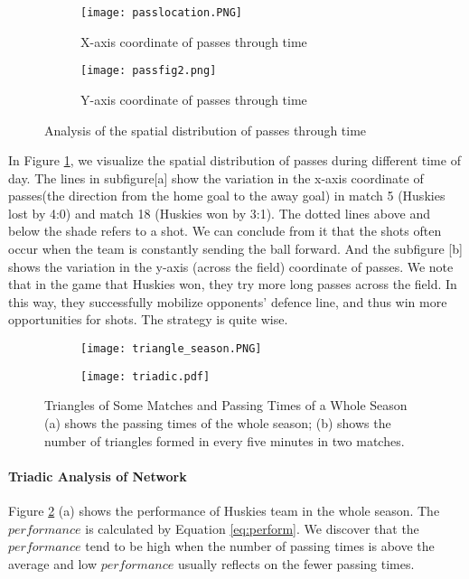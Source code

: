 \documentclass[12pt]{mcmthesis}
\begin{document}
\begin{figure}[h]
	\centering
	\begin{subfigure}[b]{0.46\textwidth}
		\texttt{[image: passlocation.PNG]}
		\caption{X-axis coordinate of passes through time}
	\end{subfigure}
	\begin{subfigure}[b]{0.46\textwidth}
		\texttt{[image: passfig2.png]}
		\caption{Y-axis coordinate of passes through time}
	\end{subfigure}
	\caption{Analysis of the spatial distribution of passes through time}
	\label{fig:pass_distribution}
\end{figure}
In Figure \ref{fig:pass_distribution}, we visualize the spatial distribution of passes during different time of day. The lines in subfigure[a] show the variation in the x-axis coordinate of passes(the direction from the home goal to the away goal) in match 5 (Huskies lost by 4:0) and match 18 (Huskies won by 3:1). The dotted lines above and below the shade refers to a shot. We can conclude from it that the shots often occur when the team is constantly sending the ball forward. And the subfigure [b] shows the variation in the y-axis (across the field) coordinate of passes. We note that in the game that Huskies won, they try more long passes across the field. In this way, they successfully mobilize opponents' defence line, and thus win more opportunities for shots. The strategy is quite wise.
\begin{figure}[h]
	\centering
	\begin{subfigure}[b]{0.47\textwidth}
		\texttt{[image: triangle\_season.PNG]}
		\caption{}
	\end{subfigure}
	\begin{subfigure}[b]{0.47\textwidth}
		\texttt{[image: triadic.pdf]}
		\caption{}
	\end{subfigure}
	
	\caption{Triangles of Some Matches and Passing Times of a Whole Season (a) shows the passing times of the whole season; (b) shows the number of triangles formed in every five minutes in two matches.}
	\label{fig:triangle}
\end{figure}
\paragraph{Triadic Analysis of Network}
Figure \ref{fig:triangle} (a) shows the performance of Huskies team in the whole season. The $performance$ is calculated by Equation \ref{eq:perform}. We discover that the $performance$ tend to be high when the number of passing times is above the average and low $performance$ usually reflects on the fewer passing times.
\end{document}
